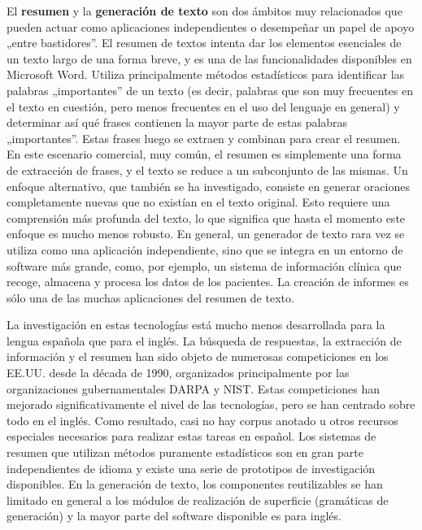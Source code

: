 \begin{multicols}{2}
El \textbf{resumen} y la \textbf{generación de texto} son dos ámbitos muy relacionados que pueden actuar como aplicaciones independientes o desempeñar un papel de apoyo „entre bastidores”. El resumen de textos intenta dar los elementos esenciales de un texto largo de una forma breve, y es una de las funcionalidades disponibles en Microsoft Word. Utiliza principalmente métodos estadísticos para identificar las palabras „importantes” de un texto (es decir, palabras que son muy frecuentes en el texto en cuestión, pero menos frecuentes en el uso del lenguaje en general) y determinar así qué frases contienen la mayor parte de estas palabras „importantes”. Estas frases luego se extraen y combinan para crear el resumen. En este escenario comercial, muy común, el resumen es simplemente una forma de extracción de frases, y el texto se reduce a un subconjunto de las mismas. Un enfoque alternativo, que también se ha investigado, consiste en generar oraciones completamente nuevas  que no existían en el texto original. Esto requiere una comprensión más profunda del texto, lo que significa que hasta el momento este enfoque es mucho menos robusto. En general, un generador de texto rara vez se utiliza como una aplicación independiente, sino que se integra en un entorno de software más grande, como, por ejemplo, un sistema de información clínica que recoge, almacena y procesa los datos de los pacientes. La creación de informes es sólo una de las muchas aplicaciones del resumen de texto.


La investigación en estas tecnologías está mucho menos desarrollada para la lengua española que para el inglés. La búsqueda de respuestas, la extracción de información y el resumen han sido objeto de numerosas competiciones en los EE.UU. desde la década de 1990, organizados principalmente por las organizaciones gubernamentales DARPA y NIST. Estas competiciones han mejorado significativamente el nivel de las tecnologías, pero se han centrado sobre todo en el inglés. Como resultado, casi no hay corpus anotado u otros recursos especiales necesarios para realizar estas tareas en español. Los sistemas de resumen que utilizan métodos puramente estadísticos son en gran parte independientes de idioma y existe una serie de prototipos de investigación disponibles. En la generación de texto, los componentes reutilizables se han limitado en general a los módulos de realización de superficie (gramáticas de generación) y la mayor parte del software disponible es para inglés.


\end{multicols}
